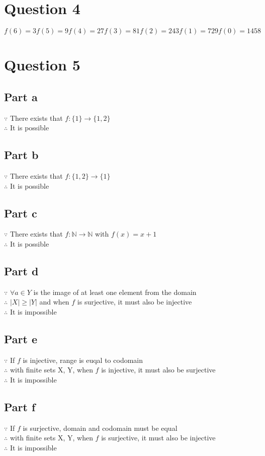 \documentclass[11pt, oneside]{article}   	%
\begin{document}
\section*{Question 4}

	$f(6)=3f(5)=9f(4)=27f(3)=81f(2)=243f(1)=729f(0)=1458$

\section*{Question 5}

	\subsection*{Part a}
	$\because$ There exists that $f:\{1\}\rightarrow \{1, 2\}$\\
	$\therefore$ It is possible
	\subsection*{Part b}
	$\because$ There exists that $f:\{1, 2\}\rightarrow \{1\}$\\
	$\therefore$ It is possible
	\subsection*{Part c}
	$\because$ There exists that $f:\mathbb{N} \rightarrow \mathbb{N}$ with $f(x)=x+1$\\
	$\therefore$ It is possible
	\subsection*{Part d}
	$\because$ $\forall a\in Y$ is the image of at least one element from the domain\\
	$\therefore$ $\left\lvert X\right\rvert \geq \left\lvert Y\right\rvert$ and when $f$ is surjective, it must also be injective\\
	$\therefore$ It is impossible
	\subsection*{Part e}
	$\because$ If $f$ is injective, range is euqal to codomain\\
	$\therefore$ with finite sets X, Y, when $f$ is injective, it must also be surjective\\
	$\therefore$ It is impossible
	\subsection*{Part f}
	$\because$ If $f$ is surjective, domain and codomain must be equal\\
	$\therefore$ with finite sets X, Y, when $f$ is surjective, it must also be injective\\
	$\therefore$ It is impossible
\end{document}
